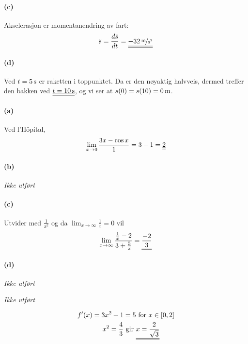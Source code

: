 \documentclass[a4paper,norsk,12pt]{article}
\begin{document}
\paragraph{(c)}
Akselerasjon er momentanendring av fart:
\begin{align*}
  \ddot{s} = \frac{d\dot{s}}{dt} = \svar{\unitfrac[-32]{m}{s^2}}
\end{align*}

\paragraph{(d)}
Ved $t=\unit[5]{s}$ er raketten i toppunktet. Da er den nøyaktig halvveis,
dermed treffer den bakken ved $\svar{t=\unit[10]{s}}$, og vi ser at
$s(0) = s(10) = \unit[0]{m}$.

\paragraph{(a)}
Ved l'Hôpital,
\begin{align*}
  \lim_{x\to 0}{\frac{3x-\cos{x}}{1}} = 3 - 1 = {\underline{\underline{2}}}
\end{align*}

\paragraph{(b)}
\textit{Ikke utført}
\paragraph{(c)}
Utvider med $\frac{1}{x^2}$ og da $\lim_{x\to\infty}\frac{1}{x} = 0$ vil
\begin{align*}
  \lim_{x\to\infty}{\frac{\frac{1}{x}-2}{3+\frac{5}{x}}} = {\underline{\underline{\frac{-2}{3}}}} \\
\end{align*}

\paragraph{(d)}
\textit{Ikke utført}

\textit{Ikke utført}

\begin{align*}
  f'(x) = 3x^2 + 1 & = 5 \text{ for } x \in [0,2]\\
  x^2 = \frac{4}{3} & \text{ gir }
  \svar{x = \frac{2}{\sqrt{3}}}
\end{align*}
\end{document}
